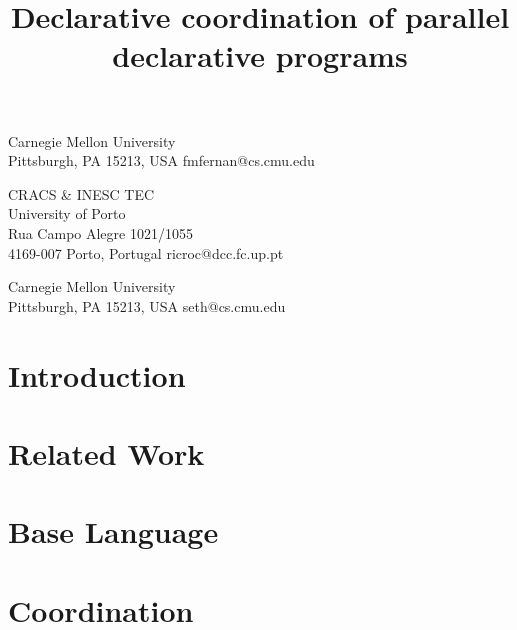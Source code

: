 \documentclass[pldi,blind]{sigplanconf-pldi15}
\begin{document}
%
%

\title{Declarative coordination of parallel declarative programs}
           {Carnegie Mellon University\\Pittsburgh, PA 15213, USA}
           {fmfernan@cs.cmu.edu}

           {CRACS \& INESC TEC\\University of Porto\\Rua Campo Alegre 1021/1055\\4169-007 Porto, Portugal}
           {ricroc@dcc.fc.up.pt}

           {Carnegie Mellon University\\Pittsburgh, PA 15213, USA}
           {seth@cs.cmu.edu}

\newcommand{\scare}[1]{``#1''} 

\maketitle
\begin{abstract}

\end{abstract}

\iffalse
\category{D.1.3}{PROGRAMMING TECHNIQUES}{Concurrent Programming}[Parallel Programming]
\category{D.3.4}{PROCESSORS}{Run-time environments}

\terms{Design, Languages, Performance}

\keywords{Parallel Programming, Linear Logic}
\fi

\section{Introduction}


\section{Related Work}


\section{Base Language}\label{sec:language}


\section{Coordination}\label{sec:coordination}

\end{document}
